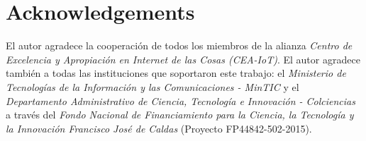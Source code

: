 \documentclass[oneside]{book}
\newcommand\blankpage{%
    \null
    \thispagestyle{empty}%
    \addtocounter{page}{-1}%
    \newpage}
\begin{document}
\pagestyle{fancy}  %
\afterpage{\blankpage}


\tableofcontents  %

\listoffigures  %
\listoftables  %
\fancyhf{}
\afterpage{\blankpage}
\clearpage
\afterpage{\blankpage}
\section*{Acknowledgements}
{
El autor agradece la cooperación de todos los miembros de la alianza \textit{Centro de Excelencia y Apropiaci\'{o}n en Internet de las Cosas (CEA-IoT)}. El autor agradece también a todas las instituciones que soportaron este trabajo: el \textit{Ministerio de Tecnolog\'{i}as de la Informaci\'{o}n y las Comunicaciones - MinTIC} y el \textit{Departamento Administrativo de Ciencia, Tecnolog\'{i}a e Innovaci\'{o}n - Colciencias} a través del \textit{Fondo Nacional de Financiamiento para la Ciencia, la Tecnolog\'{i}a y la Innovaci\'{o}n Francisco Jos\'{e} de Caldas} (Proyecto FP44842-502-2015).
}

\clearpage  %



\printglossary[type=\acronymtype,title=Special Terms, toctitle=List of terms]
\afterpage{\blankpage}

\mainmatter	  %
\pagestyle{fancy}  %
\end{document}
